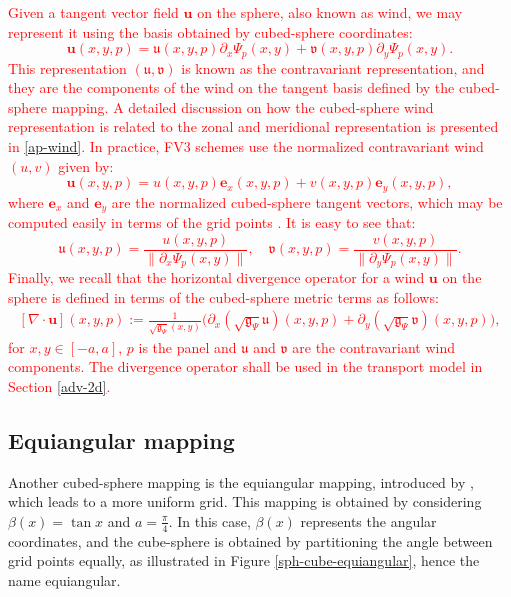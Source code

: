 \documentclass[preprint,12pt]{elsarticle}
\begin{document}
\begin{linenumbers}
\textcolor{red}{Given a tangent vector field $\boldsymbol{u}$ on the sphere, also known as wind, we may represent it using the basis obtained by cubed-sphere coordinates:
\begin{equation}
	\label{contravariant-wind}
	\boldsymbol{u}(x, y, p) = 
	\mathfrak{u}(x, y,p ) \partial_x{\Psi}_p(x, y) + 
	\mathfrak{v}(x, y, p) \partial_y{\Psi}_p(x, y).
\end{equation}
This representation $(\mathfrak{u},\mathfrak{v})$ is known as the contravariant representation, and they are the components of the wind on the tangent basis defined by the cubed-sphere mapping.
A detailed discussion on how the cubed-sphere wind representation is related to the zonal and meridional representation is presented in \ref{ap-wind}.
In practice, FV3 schemes \cite{putman:2007, harris:2021} use the normalized contravariant wind
$({u},{v})$ given by:
\begin{equation}
	\label{norm-contravariant-wind}
	\boldsymbol{u}(x, y, p) = 
	{u}(x, y, p) \boldsymbol{e}_x(x, y, p) + 
	{v}(x, y, p) \boldsymbol{e}_y(x, y, p),
\end{equation}
where $\boldsymbol{e}_x$ and $\boldsymbol{e}_y$ are the normalized cubed-sphere tangent vectors, which may be computed easily in terms of the grid points \cite[Appendix C2]{chen:2021}.
It is easy to see that:
\begin{equation}
	\label{contra-uv}
	\mathfrak{u}(x,y,p)  = \frac{{u}(x,y,p)}{\|\partial_x{\Psi}_p(x,y)\|}, \quad
	\mathfrak{v}(x,y,p)  = \frac{{v}(x,y,p)}{\|\partial_y{\Psi}_p(x,y)\|}.
\end{equation}
Finally, we recall that the horizontal divergence operator for a  wind $\boldsymbol{u}$  on the sphere is defined in terms of the cubed-sphere metric terms as follows:
\begin{align}
	\label{div-def}
	[\nabla \cdot {\boldsymbol{u}}](x,y,p) :=
	\frac{1}{\sqrt{\mathfrak{g}_{\Psi}}(x,y)}
	\bigg(
	\partial_x(\sqrt{\mathfrak{g}_{\Psi}}\mathfrak{u})(x,y,p) +
	\partial_y(\sqrt{\mathfrak{g}_{\Psi}}\mathfrak{v})(x,y,p)
	\bigg),
\end{align}
for $x,y\in[-a,a]$, $p$ is the panel and
$\mathfrak{u}$ and $\mathfrak{v}$ are the contravariant wind components.
The divergence operator shall be used in the transport model in Section \ref{adv-2d}.
}
\subsection{Equiangular mapping}
\label{cs-equiangular}
Another cubed-sphere mapping is the equiangular mapping, 
introduced by \cite{ronchi:1996}, which leads to a more uniform grid.
This mapping is obtained by considering $\beta(x) = \tan{x}$ and $a=\frac{\pi}{4}$.
In this case, $\beta(x)$ represents the angular coordinates, and the cube-sphere is obtained by partitioning the angle between
grid points equally, as illustrated in Figure \ref{sph-cube-equiangular}, hence the name equiangular.


\end{linenumbers}
\end{document}
